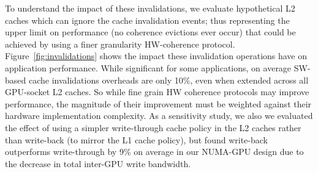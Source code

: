 To understand the impact of these invalidations, we evaluate hypothetical L2 caches which can ignore the cache 
invalidation events; thus representing
the upper limit on performance (no coherence evictions ever occur) that could be achieved by 
using a finer granularity HW-coherence protocol.
Figure~\ref{fig:invalidations} shows the impact these invalidation
operations have on application performance.
While significant for
some applications, on average SW-based cache invalidations overheads are only 10\%, even
when extended across all GPU-socket L2 caches.  So while fine grain HW coherence protocols
may improve performance, the magnitude of their improvement must be weighted against their
hardware implementation complexity.  As a sensitivity study, we also we evaluated
the effect of using a simpler write-through cache policy in the L2 caches rather than write-back (to mirror
the L1 cache policy), but found write-back outperforms write-through by 9\%
on average in our NUMA-GPU design due to the decrease in total inter-GPU write bandwidth.





